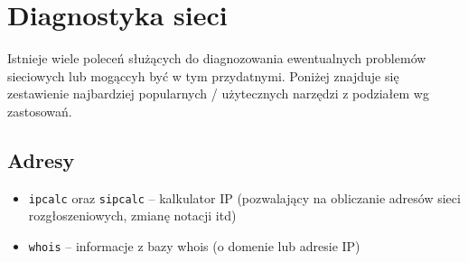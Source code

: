 % 
% 
% 
% 

\section{Diagnostyka sieci}

Istnieje wiele poleceń służących do diagnozowania ewentualnych problemów sieciowych lub mogąccyh być w tym przydatnymi.
Poniżej znajduje się zestawienie najbardziej popularnych / użytecznych narzędzi z podziałem wg zastosowań.

\subsection{Adresy}
\begin{itemize}
	\item \Verb#ipcalc# oraz \Verb#sipcalc# –
		kalkulator IP (pozwalający na obliczanie adresów sieci rozgłoszeniowych, zmianę notacji itd)
	\item \Verb#whois# –
		informacje z bazy whois (o domenie lub adresie IP)
\end{itemize}
				

